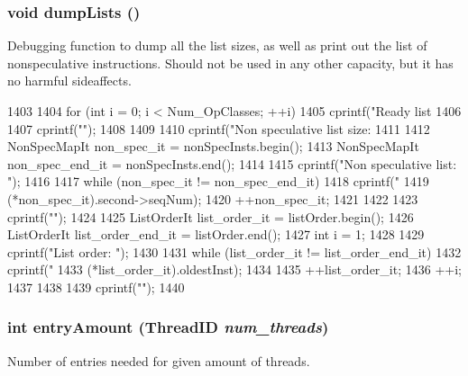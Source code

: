 \hypertarget{classInstructionQueue_a3d1dae45e8e0b5cf7c1f4f8c796d070e}{
\subsubsection[{dumpLists}]{\setlength{\rightskip}{0pt plus 5cm}void dumpLists ()}}
\label{classInstructionQueue_a3d1dae45e8e0b5cf7c1f4f8c796d070e}
Debugging function to dump all the list sizes, as well as print out the list of nonspeculative instructions. Should not be used in any other capacity, but it has no harmful sideaffects. 


\begin{DoxyCode}
1403 {
1404     for (int i = 0; i < Num_OpClasses; ++i) {
1405         cprintf("Ready list %
1406 
1407         cprintf("\n");
1408     }
1409 
1410     cprintf("Non speculative list size: %
1411 
1412     NonSpecMapIt non_spec_it = nonSpecInsts.begin();
1413     NonSpecMapIt non_spec_end_it = nonSpecInsts.end();
1414 
1415     cprintf("Non speculative list: ");
1416 
1417     while (non_spec_it != non_spec_end_it) {
1418         cprintf("%
1419                 (*non_spec_it).second->seqNum);
1420         ++non_spec_it;
1421     }
1422 
1423     cprintf("\n");
1424 
1425     ListOrderIt list_order_it = listOrder.begin();
1426     ListOrderIt list_order_end_it = listOrder.end();
1427     int i = 1;
1428 
1429     cprintf("List order: ");
1430 
1431     while (list_order_it != list_order_end_it) {
1432         cprintf("%
1433                 (*list_order_it).oldestInst);
1434 
1435         ++list_order_it;
1436         ++i;
1437     }
1438 
1439     cprintf("\n");
1440 }
\end{DoxyCode}
\hypertarget{classInstructionQueue_a5d2b0e4e7d98ea4ebd9fb98ac0d91e2f}{
\subsubsection[{entryAmount}]{\setlength{\rightskip}{0pt plus 5cm}int entryAmount ({\bf ThreadID} {\em num\_\-threads})}}
\label{classInstructionQueue_a5d2b0e4e7d98ea4ebd9fb98ac0d91e2f}
Number of entries needed for given amount of threads. 


